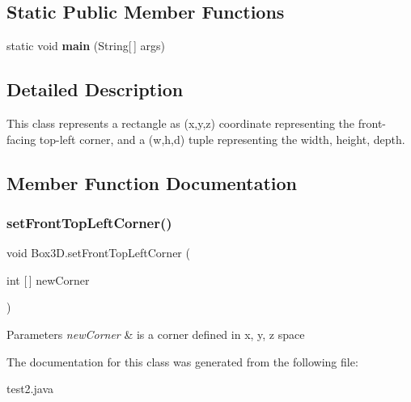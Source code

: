 \subsection*{Static Public Member Functions}
\begin{DoxyCompactItemize}
\item 
\mbox{\label{class_box3_d_acd91d77c24959e29e9644f9b76989a1f}} 
static void {\bfseries main} (String\mbox{[}$\,$\mbox{]} args)
\end{DoxyCompactItemize}


\subsection{Detailed Description}
This class represents a rectangle as (x,y,z) coordinate representing the front-\/facing top-\/left corner, and a (w,h,d) tuple representing the width, height, depth. 

\subsection{Member Function Documentation}
\mbox{\label{class_box3_d_aedca622a944e562d190b714c37b4c7c6}} 
\subsubsection{\texorpdfstring{set\+Front\+Top\+Left\+Corner()}{setFrontTopLeftCorner()}}
{\footnotesize\ttfamily void Box3\+D.\+set\+Front\+Top\+Left\+Corner (\begin{DoxyParamCaption}\item[{int \mbox{[}$\,$\mbox{]}}]{new\+Corner }\end{DoxyParamCaption})\hspace{0.3cm}{\ttfamily [inline]}}


\begin{DoxyParams}{Parameters}
{\em new\+Corner} & is a corner defined in x, y, z space \\
\hline
\end{DoxyParams}


The documentation for this class was generated from the following file\+:\begin{DoxyCompactItemize}
\item 
test2.\+java\end{DoxyCompactItemize}
